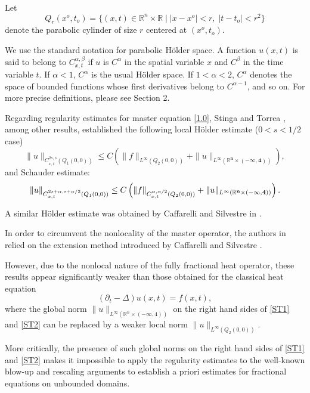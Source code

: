 \documentclass[12pt]{article}
\theoremstyle{remark}
\numberwithin{equation}{section}
\newcommand{\R}{\mathbb{R}}
\begin{document}
\medskip

Let
$$Q_r (x^o, t_o) = \{(x,t) \in \R^n \times \R \mid |x-x^o| < r, \; |t-t_o| < r^2 \}$$
denote the parabolic cylinder of size $r$ centered at $(x^o, t_o)$.

We use the standard notation for parabolic H\"{o}lder space. A function $u(x,t)$ is said to belong to $C_{x,t}^{\alpha, \beta}$ if $u$ is $C^\alpha$ in the spatial variable $x$ and $C^\beta$ in the time variable $t$. If $\alpha <1$, $C^\alpha$ is the usual H\"{o}lder space.
If $1<\alpha <2$, $C^\alpha$ denotes the space of bounded functions whose first derivatives belong to $C^{\alpha -1}$, and so on.  For more precise definitions, please see Section 2.

Regarding regularity estimates for master equation \eqref{1.0}, Stinga and Torrea \cite{ST}, among other results, established the following local H\"{o}lder estimate ($0<s<1/2$ case)
\begin{equation}  \label{ST1}
\|u\|_{C_{x,t}^{2s, s}(Q_1(0,0))} \leq C \left( \|f\|_{L^\infty(Q_2(0,0))} + \|u\|_{L^\infty (\mathbf{\R^n \times (-\infty, 4)})}\right),
\end{equation}
and Schauder estimate:
\begin{equation}  \label{ST2}
\|u\|_{C_{x,t}^{2s + \alpha, s + \alpha/2}(Q_1(0,0))} \leq C \left( \|f\|_{C_{x,t}^{\alpha, \alpha/2}(Q_2(0,0))} + \|u\|_{L^\infty (\bf{\R^n \times (-\infty, 4)})}\right) .
\end{equation}

A similar H\"{o}lder estimate was obtained by Caffarelli and Silvestre in \cite{CS1}.



In order to circumvent the nonlocality of the master operator, the authors in \cite{ST} relied on the extension method introduced by Caffarelli and Silvestre \cite{CS}.

However, due to the nonlocal nature of the fully fractional heat operator, these results appear significantly weaker than those obtained for the
 classical heat equation
$$ (\partial_t - \Delta) u(x,t) = f(x,t),  $$
where the global norm $\|u\|_{L^\infty (\R^n \times (-\infty, 4))}$ on the right hand sides of \eqref{ST1} and \eqref{ST2} can  be replaced by a weaker local norm $\|u\|_{L^\infty (Q_2(0,0))}$.

 More critically, the presence of such global norms on the right hand sides of \eqref{ST1} and \eqref{ST2} makes it impossible to apply the regularity estimates  to the well-known blow-up  and rescaling arguments to establish a priori estimates for fractional equations on unbounded domains.
\end{document}
